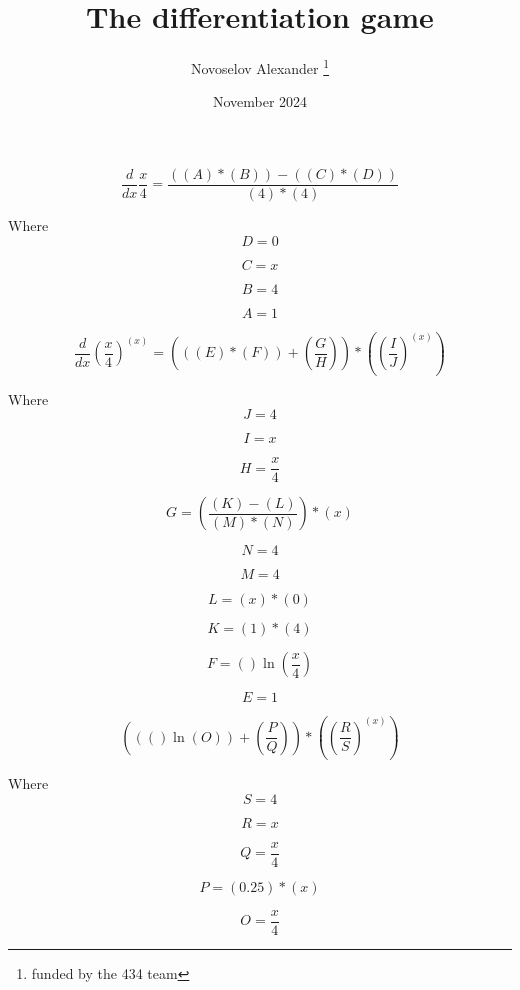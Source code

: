 \documentclass[12pt, letterpaper, twoside]{article}
\title{The differentiation game}
\author{Novoselov Alexander \thanks{funded by the 434 team}}
\date{November 2024}
\begin{document}
\maketitle

\[\frac{d}{dx}\frac{x}{4} = \frac{((A)*(B))-((C)*(D))}{(4)*(4)}\]


Where 
\[D = 0\]

\[C = x\]

\[B = 4\]

\[A = 1\]

\[\frac{d}{dx}(\frac{x}{4})^(x) = (((E)*(F))+(\frac{G}{H}))*((\frac{I}{J})^(x))\]


Where 
\[J = 4\]

\[I = x\]

\[H = \frac{x}{4}\]

\[G = (\frac{(K)-(L)}{(M)*(N)})*(x)\]

\[N = 4\]

\[M = 4\]

\[L = (x)*(0)\]

\[K = (1)*(4)\]

\[F = ()\ln(\frac{x}{4})\]

\[E = 1\]

\[((()\ln(O))+(\frac{P}{Q}))*((\frac{R}{S})^(x))\]

Where 
\[S = 4\]

\[R = x\]

\[Q = \frac{x}{4}\]

\[P = (0.25)*(x)\]

\[O = \frac{x}{4}\]
\end{document}
